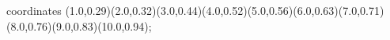 					coordinates { (1.0,0.29)(2.0,0.32)(3.0,0.44)(4.0,0.52)(5.0,0.56)(6.0,0.63)(7.0,0.71)(8.0,0.76)(9.0,0.83)(10.0,0.94)};